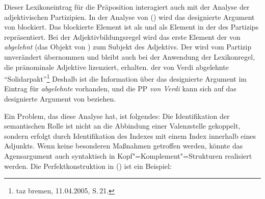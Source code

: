 {\noindent
Dieser Lexikoneintrag für die Präposition interagiert auch mit der Analyse der adjektivischen Partizipien.
In der Analyse von () wird das designierte Argument von  blockiert. Das blockierte
Element ist als \subjw und als Element in der \daliste des Partizips repräsentiert. Bei der Adjektivbildungsregel
wird das erste Element der \argstl von \emph{abgelehnt} (das Objekt von ) zum Subjekt
des Adjektivs. Der \daw wird vom Partizip unverändert übernommen und bleibt auch bei der Anwendung
der Lexikonregel, die pränominale Adjektive lizenziert, erhalten.
\ea
der von Verdi abgelehnte "`Solidarpakt"'\footnote{
  taz bremen, 11.04.2005, S.\,21.%
}
\z
Deshalb ist die Information über das designierte Argument im Eintrag für \emph{abgelehnte} vorhanden,
und die PP \emph{von Verdi} kann sich auf das designierte Argument von  beziehen.

Ein Problem, das diese Analyse hat, ist folgendes: Die Identifikation der semantischen Rolle
ist nicht an die Abbindung einer Valenzstelle gekoppelt, sondern erfolgt durch Identifikation
des Indexes mit einem Index innerhalb eines Adjunkts. Wenn keine besonderen Maßnahmen getroffen
werden, könnte das Agensargument auch syntaktisch in Kopf"=Komplement"=Strukturen realisiert werden.
Die Perfektkonstruktion in () ist ein Beispiel: 

}
